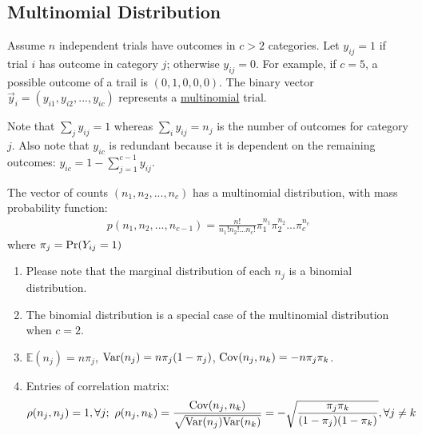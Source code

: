 \documentclass[11pt]{elegantbook}
\begin{document}
\subsection{Multinomial Distribution}
Assume $n$ independent trials have outcomes in $c > 2$ categories. Let $y_{ij} = 1$ if trial $i$ has outcome in category $j$; otherwise $y_{ij} = 0$. For example, if $c = 5$, a possible outcome of a trail is $(0, 1, 0, 0, 0)$. The binary vector $\vec{y}_i = (y_{i1}, y_{i2}, . . . , y_{ic})$ represents a \underline{multinomial} trial.

Note that $\sum_{j}y_{ij}=1$ whereas $\sum_{i}y_{ij}=n_j$ is the number of outcomes for category $j$. Also note that $y_{ic}$ is redundant because it is dependent on the remaining outcomes: $y_{ic} = 1 - \sum_{j=1}^{c-1} y_{ij}$.

The vector of counts $(n_1,n_2,...,n_c)$ has a multinomial distribution, with mass probability function:
\begin{equation}
    \begin{aligned}
        p(n_1,n_2,...,n_{c-1})=\frac{n!}{n_1!n_2!...n_c!}\pi_1^{n_1}\pi_2^{n_2}...\pi_c^{n_c}
    \end{aligned}
    \nonumber
\end{equation}
where $\pi_j=\textnormal{Pr}(Y_{ij}=1)$
\begin{enumerate}
    \item Please note that the marginal distribution of each $n_j$ is a binomial distribution.
    \item The binomial distribution is a special case of the multinomial distribution when $c = 2$.
    \item $\mathbb{E}(n_j)=n\pi_j$, $\textnormal{Var}(n_j)=n\pi_j(1-\pi_j)$, $\textnormal{Cov}(n_j,n_k)=-n\pi_j\pi_k$.
    \item Entries of correlation matrix: $$\rho(n_j,n_j)=1,\forall j;\ \rho(n_j,n_k)=\frac{\textnormal{Cov}(n_j,n_k)}{\sqrt{\textnormal{Var}(n_j)\textnormal{Var}(n_k)}}=-\sqrt{\frac{\pi_j\pi_k}{(1-\pi_j)(1-\pi_k)}},\forall j\neq k$$
\end{enumerate}
\end{document}
